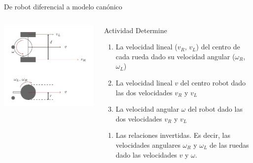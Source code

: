 \documentclass[presentation,aspectratio=169]{beamer}
\begin{document}
\begin{frame}[label={sec:org29a6f2f}]{De robot diferencial a modelo canónico}
\begin{columns}
\begin{column}{0.4\columnwidth}
\begin{center}
 \includegraphics[width=1.0\linewidth]{../figures/unicycle-model-details}
\end{center}
\end{column}

\begin{column}{0.6\columnwidth}
\pause

\alert{Actividad} Determine

\begin{enumerate}
\item La velocidad lineal (\(v_R\), \(v_L\)) del centro de cada rueda dado su velocidad angular (\(\omega_R\), \(\omega_L\))

\item La velocidad lineal \(v\) del centro robot dado las dos velocidades \(v_R\) y \(v_L\)

\item La velocidad angular \(\omega\) del robot dado las dos velocidades \(v_R\) y \(v_L\)
\end{enumerate}


\begin{enumerate}
\item Las relaciones invertidas. Es decir, las velocidades angulares \(\omega_R\) y \(\omega_L\) de las ruedas dado las velocidades \(v\) y \(\omega\).
\end{enumerate}
\end{column}
\end{columns}
\end{frame}
\end{document}
